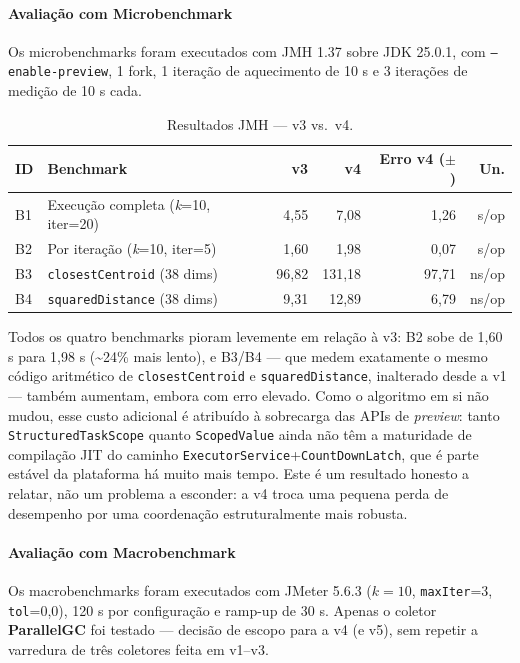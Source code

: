 \paragraph{Avaliação com Microbenchmark}

Os microbenchmarks foram executados com JMH 1.37 sobre JDK 25.0.1, com
\texttt{--enable-preview}, 1 fork, 1 iteração de aquecimento de 10 s e 3
iterações de medição de 10 s cada.

\begin{table}[H]
\centering
\begin{tabular}{lp{4.2cm}rrrr}
\hline
\textbf{ID} & \textbf{Benchmark} & \textbf{v3} & \textbf{v4} & \textbf{Erro v4 ($\pm$)} & \textbf{Un.} \\
\hline
B1 & Execução completa (\textit{k}=10, iter=20) & 4{,}55 & 7{,}08  & 1{,}26 & s/op \\
B2 & Por iteração (\textit{k}=10, iter=5)        & 1{,}60 & 1{,}98  & 0{,}07 & s/op \\
B3 & \texttt{closestCentroid} (38 dims)           & 96{,}82 & 131{,}18 & 97{,}71 & ns/op \\
B4 & \texttt{squaredDistance} (38 dims)           &  9{,}31 &  12{,}89 &  6{,}79 & ns/op \\
\hline
\end{tabular}
\caption{Resultados JMH --- v3 vs.\ v4.}
\label{tab:jmh-v4}
\end{table}

Todos os quatro benchmarks pioram levemente em relação à v3: B2 sobe de
1,60 s para 1,98 s (\textasciitilde24\% mais lento), e B3/B4 --- que
medem exatamente o mesmo código aritmético de \texttt{closestCentroid} e
\texttt{squaredDistance}, inalterado desde a v1 --- também aumentam,
embora com erro elevado. Como o algoritmo em si não mudou, esse custo
adicional é atribuído à sobrecarga das APIs de \textit{preview}: tanto
\texttt{StructuredTaskScope} quanto \texttt{ScopedValue} ainda não têm a
maturidade de compilação JIT do caminho
\texttt{ExecutorService}+\texttt{CountDownLatch}, que é parte estável da
plataforma há muito mais tempo. Este é um resultado honesto a relatar,
não um problema a esconder: a v4 troca uma pequena perda de desempenho
por uma coordenação estruturalmente mais robusta.

\paragraph{Avaliação com Macrobenchmark}

Os macrobenchmarks foram executados com JMeter 5.6.3 ($k=10$,
\texttt{maxIter}=3, \texttt{tol}=0,0), 120 s por configuração e ramp-up
de 30 s. Apenas o coletor \textbf{ParallelGC} foi testado --- decisão de
escopo para a v4 (e v5), sem repetir a varredura de três coletores feita
em v1--v3.

